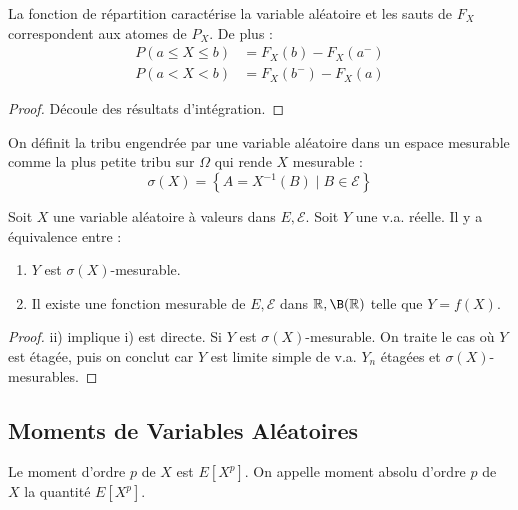 \documentclass{cours}
\begin{document}
    \begin{proposition}
        La fonction de répartition caractérise la variable aléatoire et les sauts de $F_{X}$ correspondent aux atomes de $P_{X}$. De plus : 
        \[
            \begin{aligned}
                P\left(a \leq X \leq b\right) &= F_{X}(b) - F_{X}(a^{-})\\
                P\left(a < X < b\right) &= F_{X}(b^{-}) - F_{X}(a)
            \end{aligned}    
        \]
    \end{proposition}
    \begin{proof}
        Découle des résultats d'intégration.
    \end{proof}

    \begin{definition}
        On définit la tribu engendrée par une variable aléatoire dans un espace mesurable comme la plus petite tribu sur $\Omega$ qui rende $X$ mesurable : 
        \[
            \sigma(X) = \left\{A = X^{-1}(B)\mid B\in \mathcal{E}\right\}    
        \]
    \end{definition}

    \begin{proposition}
        Soit $X$ une variable aléatoire à valeurs dans $E, \mathcal{E}$. Soit $Y$ une v.a. réelle. Il y a équivalence entre :
        \begin{enumerate}
            \item $Y$ est $\sigma(X)$-mesurable. 
            \item Il existe une fonction mesurable de $E, \mathcal{E}$ dans $\R, \B(\R)$ telle que $Y = f(X)$.
        \end{enumerate}
    \end{proposition}
    \begin{proof}
        ii) implique i) est directe. Si $Y$ est $\sigma(X)$-mesurable. On traite le cas où $Y$ est étagée, puis on conclut car $Y$ est limite simple de v.a. $Y_{n}$ étagées et $\sigma(X)$-mesurables.
    \end{proof}
    
    \subsection{Moments de Variables Aléatoires}
    \begin{definition}
        Le moment d'ordre $p$ de $X$ est $E[X^{p}]$. On appelle moment absolu d'ordre $p$ de $X$ la quantité $E\left[X^{p}\right]$.
    \end{definition}
\end{document}
